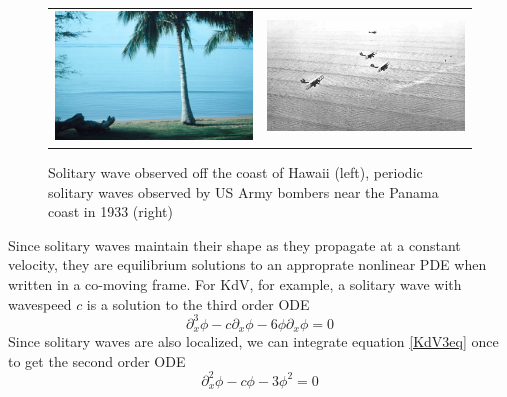 \documentclass[thesis.tex]{subfiles}
\begin{document}
\begin{figure}
\begin{center}
\begin{tabular}{cc}
\includegraphics[width=7cm]{images/intro/beach.jpg} &
\includegraphics[width=7cm]{images/intro/cnoidal.jpg}
\end{tabular}
\caption{Solitary wave observed off the coast of Hawaii \cite{ANDRIOPOULOS2009} (left), periodic solitary waves observed by US Army bombers near the Panama coast in 1933 (right) }
\label{fig:waterwave}
\end{center}
\end{figure}

Since solitary waves maintain their shape as they propagate at a constant velocity, they are equilibrium solutions to an approprate nonlinear PDE when written in a co-moving frame. For KdV, for example, a solitary wave with wavespeed $c$ is a solution to the third order ODE 
\begin{equation}\label{KdV3eq}
\partial_x^3 \phi - c \partial_x \phi - 6 \phi \partial_x \phi = 0
\end{equation}
Since solitary waves are also localized, we can integrate equation \cref{KdV3eq} once to get the second order ODE
\begin{equation}\label{KdV3eq}
\partial_x^2 \phi - c \phi - 3 \phi^2 = 0
\end{equation}
\end{document}
